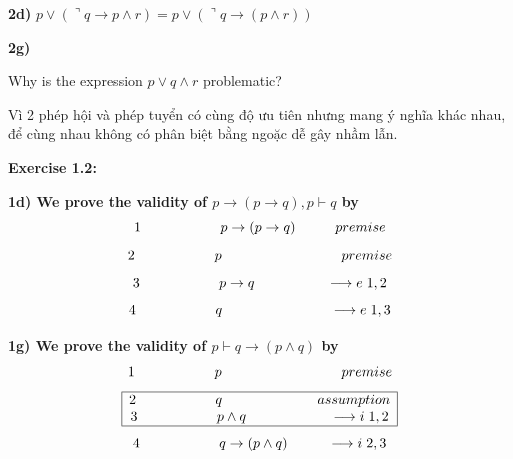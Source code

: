 \documentclass[a4paper]{article}
\begin{document}
\textbf{\large\hspace{1cm} 2d)}{\large\hspace{0.5cm}
	$	p \vee (\urcorner q \rightarrow p \wedge r) = p \vee (\urcorner q \rightarrow( p \wedge r))$}

\textbf{\large\hspace{1cm} 2g)}{\large\hspace{0.5cm}Why is the expression $p \vee q \wedge r$ problematic?

\hspace{1cm} Vì 2 phép hội và phép tuyển có cùng độ ưu tiên nhưng mang ý nghĩa khác nhau, để cùng nhau không có phân biệt bằng ngoặc dễ gây nhầm lẫn.}

\textbf{\large\hspace{0.5cm} Exercise 1.2:}

\textbf{\large\hspace{1cm} 1d) We prove the validity of	$p \rightarrow (p \rightarrow q), p \vdash q$ by}
{\large
$$1 \hspace{2 cm} p \rightarrow (p \rightarrow q) \hspace{1 cm} premise$$ $$2 \hspace{2 cm}  p  \hspace{3 cm} premise$$ $$3 \hspace{2 cm} p\rightarrow q \hspace{1.8 cm} \longrightarrow e\hspace{0.1 cm} 1,2$$ $$4 \hspace{2 cm} q \hspace{2.7 cm} \longrightarrow e\hspace{0.1 cm} 1,3$$}

\textbf{\large\hspace{1cm} 1g) We prove the validity of	$p \vdash q \rightarrow (p \wedge q)$ by}
{\large $$1 \hspace{2 cm} p \hspace{3 cm} premise$$
$$\begin{array}{|c|} 
\hline
\textcolor{black}{2 \hspace{2 cm} q \hspace{2.4 cm} assumption}\\
\textcolor{black}{3 \hspace{2 cm} p \wedge q \hspace{2.1 cm} \longrightarrow i \hspace{0.1 cm} 1,2}\\
\hline
\end{array}$$
$$4 \hspace{2 cm} q \rightarrow (p \wedge q) \hspace{1 cm} \longrightarrow i\hspace{0.1 cm} 2,3$$}
\end{document}
